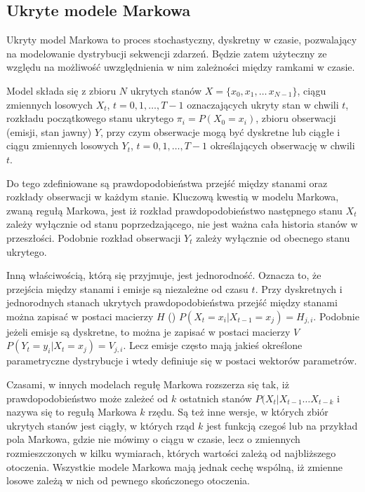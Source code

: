 \subsection{Ukryte modele Markowa}\label{sec:hmm}

Ukryty model Markowa to proces stochastyczny, dyskretny w czasie, pozwalający na modelowanie dystrybucji 
sekwencji zdarzeń. Będzie zatem użyteczny ze względu na możliwość uwzględnienia w nim zależności 
między ramkami w czasie.

Model składa się z zbioru $N$ ukrytych stanów $X = \{x_0, x_1, \dots\, x_{N-1}\}$, ciągu zmiennych losowych
$X_t$, $t = 0, 1, \dots, T - 1$ oznaczających ukryty stan w chwili $t$, rozkładu początkowego stanu ukrytego
$\pi_i = P(X_0 = x_i)$, zbioru obserwacji (emisji, stan jawny) $Y$, przy czym obserwacje mogą być dyskretne 
lub ciągłe i ciągu zmiennych losowych $Y_t$, $t = 0, 1, \dots, T - 1$ określających obserwację w chwili $t$.

Do tego zdefiniowane są prawdopodobieństwa przejść między stanami oraz rozkłady obserwacji w każdym stanie. 
Kluczową kwestią w modelu Markowa, zwaną regułą Markowa, jest iż rozkład prawdopodobieństwo następnego stanu $X_t$ 
zależy wyłącznie od stanu poprzedzającego, nie jest ważna cała historia stanów w przeszłości. Podobnie rozkład
obserwacji $Y_t$ zależy wyłącznie od obecnego stanu ukrytego. 

Inną właściwością, którą się przyjmuje, jest jednorodność. Oznacza to, że przejścia między stanami i emisje są
niezależne od czasu $t$. Przy dyskretnych i jednorodnych stanach ukrytych prawdopodobieństwa przejść
między stanami można zapisać w postaci macierzy $H$ () $P(X_t = x_i | X_{t-1} = x_j) = H_{j, i}$.
Podobnie jeżeli emisje są dyskretne, to można je zapisać w postaci macierzy $V$ $P(Y_t = y_i | X_t = x_j) = V_{j, i}$.
Lecz emisje często mają jakieś określone parametryczne dystrybucje i wtedy definiuje się w postaci wektorów parametrów.

Czasami, w innych modelach regułę Markowa rozszerza się tak, iż prawdopodobieństwo może zależeć od $k$ ostatnich stanów
$P(X_t | X_{t-1} \dots X_{t-k}$ i nazywa się to regułą Markowa $k$ rzędu. Są też inne wersje, w których zbiór
ukrytych stanów jest ciągły, w których rząd $k$ jest funkcją czegoś lub na przykład pola Markowa, 
gdzie nie mówimy o ciągu w czasie, lecz o zmiennych rozmieszczonych
w kilku wymiarach, których wartości zależą od najbliższego otoczenia. Wszystkie modele Markowa mają jednak cechę wspólną, iż
zmienne losowe zależą w nich od pewnego skończonego otoczenia.


